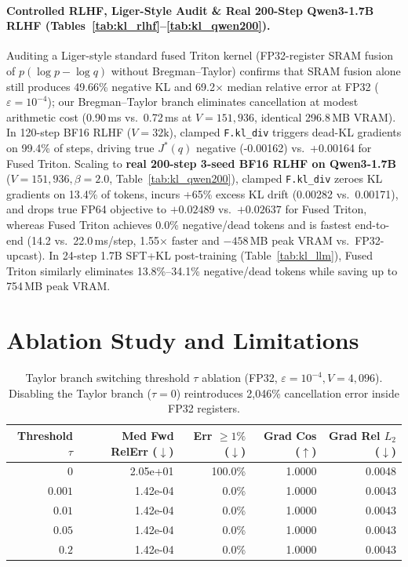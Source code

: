 \documentclass[10pt,twocolumn]{article}
\begin{document}
\paragraph{Controlled RLHF, Liger-Style Audit \& Real 200-Step Qwen3-1.7B RLHF (Tables~\ref{tab:kl_rlhf}--\ref{tab:kl_qwen200}).} Auditing a Liger-style standard fused Triton kernel (FP32-register SRAM fusion of $p(\log p - \log q)$ without Bregman--Taylor) confirms that SRAM fusion alone still produces 49.66\% negative KL and 69.2$\times$ median relative error at FP32 ($\varepsilon=10^{-4}$); our Bregman--Taylor branch eliminates cancellation at modest arithmetic cost (0.90\,ms vs.\ 0.72\,ms at $V=151{,}936$, identical 296.8\,MB VRAM). In 120-step BF16 RLHF ($V=32\text{k}$), clamped \texttt{F.kl\_div} triggers dead-KL gradients on 99.4\% of steps, driving true $J^*(q)$ negative (-0.00162) vs.\ +0.00164 for Fused Triton. Scaling to \textbf{real 200-step 3-seed BF16 RLHF on Qwen3-1.7B} ($V=151{,}936, \beta=2.0$, Table~\ref{tab:kl_qwen200}), clamped \texttt{F.kl\_div} zeroes KL gradients on 13.4\% of tokens, incurs +65\% excess KL drift (0.00282 vs.\ 0.00171), and drops true FP64 objective to $+0.02489$ vs.\ $+0.02637$ for Fused Triton, whereas Fused Triton achieves 0.0\% negative/dead tokens and is fastest end-to-end (14.2 vs.\ 22.0\,ms/step, 1.55$\times$ faster and $-458$\,MB peak VRAM vs.\ FP32-upcast). In 24-step 1.7B SFT+KL post-training (Table~\ref{tab:kl_llm}), Fused Triton similarly eliminates 13.8\%--34.1\% negative/dead tokens while saving up to 754\,MB peak VRAM.

\section{Ablation Study and Limitations}
\begin{table}[t]
  \centering
  \caption{Taylor branch switching threshold $\tau$ ablation (FP32, $\varepsilon=10^{-4}, V=4{,}096$). Disabling the Taylor branch ($\tau=0$) reintroduces 2,046\% cancellation error inside FP32 registers.}
  \label{tab:kl_ablation}
  \scriptsize
  \begin{tabular}{rrrrr}
    \toprule
    Threshold $\tau$ & Med Fwd RelErr ($\downarrow$) & Err $\ge 1\%$ ($\downarrow$) & Grad Cos ($\uparrow$) & Grad Rel $L_2$ ($\downarrow$) \\
    \midrule
        $0$ & 2.05e+01 & 100.0\% & 1.0000 & 0.0048 \\
    $0.001$ & 1.42e-04 & 0.0\% & 1.0000 & 0.0043 \\
    $0.01$ & 1.42e-04 & 0.0\% & 1.0000 & 0.0043 \\
    $0.05$ & 1.42e-04 & 0.0\% & 1.0000 & 0.0043 \\
    $0.2$ & 1.42e-04 & 0.0\% & 1.0000 & 0.0043 \\
    \bottomrule
  \end{tabular}
\end{table}
\end{document}
